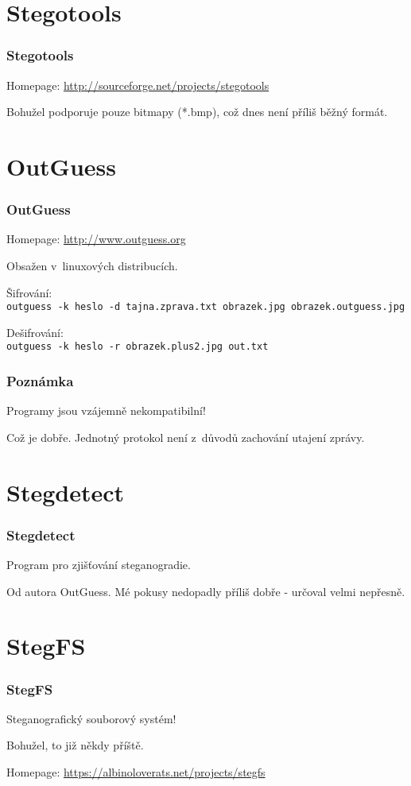 \documentclass[xetex]{beamer}
\begin{document}
\section{Stegotools}
\begin{frame}
	\frametitle{Stegotools}
	Homepage: \url{http://sourceforge.net/projects/stegotools}
	
	Bohužel podporuje pouze bitmapy (*.bmp), což dnes není příliš běžný formát.
\end{frame}

\section{OutGuess}
\begin{frame}
	\frametitle{OutGuess}
	Homepage: \url{http://www.outguess.org}
	
	Obsažen v~linuxových distribucích. 
	
	Šifrování:\\
	\tt{outguess -k heslo -d tajna.zprava.txt obrazek.jpg obrazek.outguess.jpg}
	
	Dešifrování:\\
	\tt{outguess -k heslo -r obrazek.plus2.jpg out.txt}
\end{frame}

\begin{frame}
	\frametitle{Poznámka}
	Programy jsou vzájemně nekompatibilní!
	
	Což je dobře. Jednotný protokol není z~důvodů zachování utajení zprávy.
\end{frame}

\section{Stegdetect}
\begin{frame}
	\frametitle{Stegdetect}
	Program pro zjišťování steganogradie.
	
	Od autora OutGuess.	Mé pokusy nedopadly příliš dobře - určoval velmi nepřesně.
\end{frame}

\section{StegFS}
\begin{frame}
	\frametitle{StegFS}
	Steganografický souborový systém!

	Bohužel, to již někdy příště.

	Homepage: \url{https://albinoloverats.net/projects/stegfs}
\end{frame}
\end{document}
